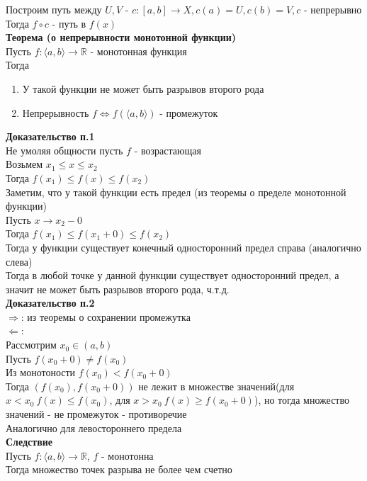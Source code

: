 \documentclass[12pt]{article}
\begin{document}
Построим путь между $U, V$ - $c: [a,b] \rightarrow X, c(a) = U, c(b) = V, c$ - непрерывно\\
Тогда $f\circ c$ - путь в $f(x)$\\
\textbf{Теорема (о непрерывности монотонной функции)}\\
Пусть $f: \langle a, b \rangle \rightarrow \mathbb{R}$ - монотонная функция\\
Тогда
\begin{enumerate}
    \item У такой функции не может быть разрывов второго рода
    \item Непрерывность $f \Leftrightarrow f(\langle a, b \rangle)$ - промежуток
\end{enumerate}
\textbf{Доказательство п.1}\\
Не умоляя общности пусть $f$ - возрастающая\\
Возьмем $x_1 \leq x \leq x_2$\\
Тогда $f(x_1) \leq f(x) \leq f(x_2)$\\
Заметим, что у такой функции есть предел (из теоремы о пределе монотонной функции)\\
Пусть $x \rightarrow x_2 - 0$\\
Тогда $f(x_1) \leq f(x_1+0) \leq f(x_2)$\\
Тогда у функции существует конечный односторонний предел справа (аналогично слева)\\
Тогда в любой точке у данной функции существует односторонний предел, а значит не может быть разрывов второго рода, ч.т.д.\\
\textbf{Доказательство п.2}\\
$\Rightarrow$: из теоремы о сохранении промежутка\\
$\Leftarrow$:\\
Рассмотрим $x_0 \in (a, b)$\\
Пусть $f(x_0 + 0) \neq f(x_0)$\\
Из монотоности $f(x_0) < f(x_0 + 0)$\\
Тогда $(f(x_0), f(x_0 + 0))$ не лежит в множестве значений(для $x < x_0\ f(x) \leq f(x_0)$, для $x > x_0\ f(x) \geq f(x_0+0)$), но тогда множество значений - не промежуток - противоречие\\
Аналогично для левостороннего предела\\
\textbf{Следствие}\\
Пусть $f:\langle a,b\rangle \rightarrow \mathbb{R}$, $f$ - монотонна\\
Тогда множество точек разрыва не более чем счетно\\
\end{document}

